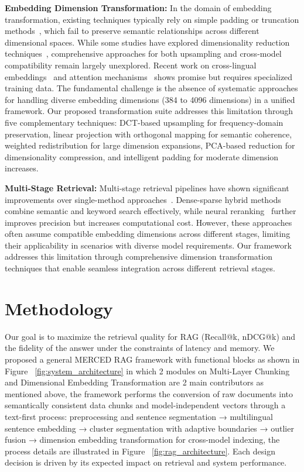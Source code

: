 \documentclass[10pt,twocolumn,letterpaper]{article}
\begin{document}
\vspace{0.5em}
\textbf{Embedding Dimension Transformation:} In the domain of embedding transformation, existing techniques typically rely on simple padding or truncation methods~\cite{anderson2023embedding}, which fail to preserve semantic relationships across different dimensional spaces. While some studies have explored dimensionality reduction techniques~\cite{garcia2024dimensionality}, comprehensive approaches for both upsampling and cross-model compatibility remain largely unexplored. Recent work on cross-lingual embeddings~\cite{conneau2018word} and attention mechanisms~\cite{michel2019are,voita2019analyzing} shows promise but requires specialized training data. The fundamental challenge is the absence of systematic approaches for handling diverse embedding dimensions (384 to 4096 dimensions) in a unified framework. Our proposed transformation suite addresses this limitation through five complementary techniques: DCT-based upsampling for frequency-domain preservation, linear projection with orthogonal mapping for semantic coherence, weighted redistribution for large dimension expansions, PCA-based reduction for dimensionality compression, and intelligent padding for moderate dimension increases.

\vspace{0.5em}
\textbf{Multi-Stage Retrieval:} Multi-stage retrieval pipelines have shown significant improvements over single-method approaches~\cite{gao2021retrieval}. Dense-sparse hybrid methods combine semantic and keyword search effectively, while neural reranking~\cite{mao2023neural,nogueira2019passage} further improves precision but increases computational cost. However, these approaches often assume compatible embedding dimensions across different stages, limiting their applicability in scenarios with diverse model requirements. Our framework addresses this limitation through comprehensive dimension transformation techniques that enable seamless integration across different retrieval stages.

\section{Methodology}

Our goal is to maximize the retrieval quality for RAG (Recall@k, nDCG@k) and the fidelity of the answer under the constraints of latency and memory. We proposed a general MERCED RAG framework with functional blocks as shown in Figure ~\ref{fig:system_architecture} in which 2 modules on Multi-Layer Chunking and Dimensional Embedding Transformation are 2 main contributors as mentioned above, the framework performs the conversion of raw documents into semantically consistent data chunks and model-independent vectors through a text-first process: preprocessing and sentence segmentation → multilingual sentence embedding → cluster segmentation with adaptive boundaries → outlier fusion → dimension embedding transformation for cross-model indexing, the process details are illustrated in Figure ~\ref{fig:rag_architecture}. Each design decision is driven by its expected impact on retrieval and system performance.
\end{document}
